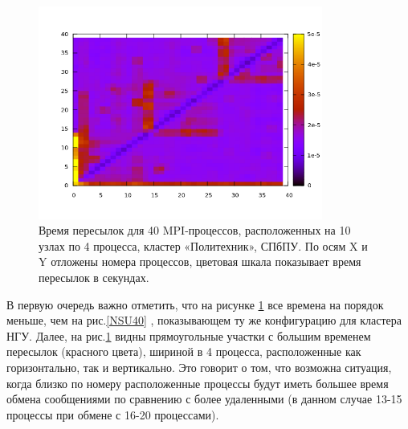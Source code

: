         \begin{figure}[htb]
        	\begin{center}
        		\includegraphics[height=7cm,keepaspectratio]{images/RomanenkoAASnytnikovAVChernykhIGadaptationtosupercomputerfinalEXTENDEDREFERENCES-img11.png}
        	\end{center}
        	\caption{Время пересылок для 40 MPI-процессов, расположенных на 10 узлах по 4 процесса, кластер «Политехник», СПбПУ. По осям X и Y отложены номера процессов, цветовая шкала показывает время пересылок в секундах.}
        	\label{Poly40}
        \end{figure}
        
        
       
        В первую очередь важно отметить, что на рисунке \ref{Poly40} все времена на порядок меньше, чем на рис.\ref{NSU40} , показывающем ту же конфигурацию для кластера НГУ. Далее, на рис.\ref{Poly40} видны прямоугольные участки с большим временем пересылок (красного цвета), шириной в 4 процесса, расположенные как горизонтально, так и вертикально. Это говорит о том, что возможна ситуация, когда близко по номеру расположенные процессы будут иметь большее время обмена сообщениями по сравнению с более удаленными (в данном случае 13-15 процессы при обмене с  16-20 процессами). 
        
